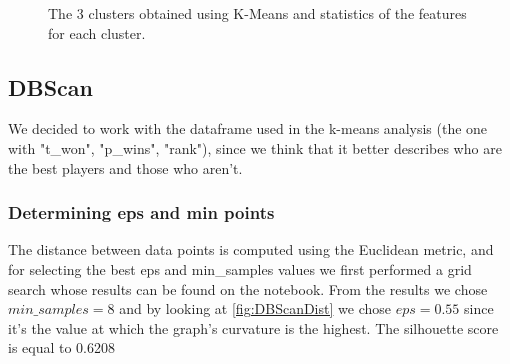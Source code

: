 
\begin{figure}[H]
    \centering
    \caption{The 3 clusters obtained using K-Means and statistics of the features for each cluster.}
    \label{fig:kmeansAvg}
\end{figure}

\subsection{DBScan}
We decided to work with the dataframe used in the k-means analysis (the one with "t\_won", "p\_wins", "rank"), since we think that it better describes who are the best players and those who aren't.

\subsubsection{Determining eps and min points}
The distance between data points is computed using the Euclidean metric, and for selecting the best eps and min\_samples values we first performed a grid search whose results can be found on the notebook. From the results we chose $min\_samples=8$ and by looking at \autoref{fig:DBScanDist} we chose $eps=0.55$ since it's the value at which the graph's curvature is the highest. The silhouette score is equal to 0.6208

